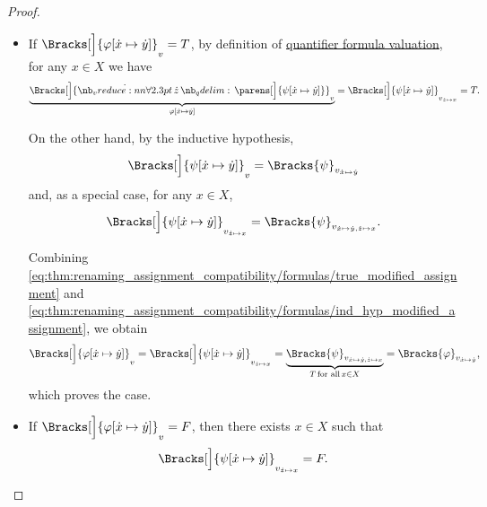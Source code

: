 \begin{proof}
\begin{itemize}
\begin{itemize}
      \begin{itemize}
        \item If \( \Bracks[\Big]{\varphi[\synx \mapsto \syny]}_v = T \), by definition of \hyperref[def:first_order_valuation/formula_valuation]{quantifier formula valuation}, for any \( x \in X \) we have
        \begin{equation}\label{eq:thm:renaming_assignment_compatibility/formulas/true_modified_assignment}
          \underbrace{\Bracks[\Big]{\qforall \synz \parens[\Big]{ \psi[\synx \mapsto \syny] } }_v}_{\varphi[\synx \mapsto \syny]}
          =
          \Bracks[\Big]{\psi[\synx \mapsto \syny]}_{v_{\synz \mapsto x}}
          =
          T.
        \end{equation}

        On the other hand, by the inductive hypothesis,
        \begin{equation*}
          \Bracks[\Big]{ \psi[\synx \mapsto \syny] }_v = \Bracks{\psi}_{v_{\synx \mapsto \syny}}
        \end{equation*}
        and, as a special case, for any \( x \in X \),
        \begin{equation}\label{eq:thm:renaming_assignment_compatibility/formulas/ind_hyp_modified_assignment}
          \Bracks[\Big]{ \psi[\synx \mapsto \syny] }_{v_{\synz \mapsto x}} = \Bracks{\psi}_{v_{\synx \mapsto \syny, \synz \mapsto x}}.
        \end{equation}

        Combining \eqref{eq:thm:renaming_assignment_compatibility/formulas/true_modified_assignment} and \eqref{eq:thm:renaming_assignment_compatibility/formulas/ind_hyp_modified_assignment}, we obtain
        \begin{equation*}
          \Bracks[\Big]{ \varphi[\synx \mapsto \syny] }_v
          =
          \Bracks[\Big]{ \psi[\synx \mapsto \syny] }_{v_{\synz \mapsto x}}
          =
          \underbrace{\Bracks{\psi}_{v_{\synx \mapsto \syny, \synz \mapsto x}}}_{T \T*{for all} x \in X}
          =
          \Bracks{\varphi}_{v_{\synx \mapsto \syny}},
        \end{equation*}
        which proves the case.

        \item If \( \Bracks[\Big]{\varphi[\synx \mapsto \syny]}_v = F \), then there exists \( x \in X \) such that
        \begin{equation*}
          \Bracks[\Big]{\psi[\synx \mapsto \syny]}_{v_{\synz \mapsto x}} = F.
        \end{equation*}


\end{itemize}
\end{itemize}
\end{itemize}
\end{proof}
